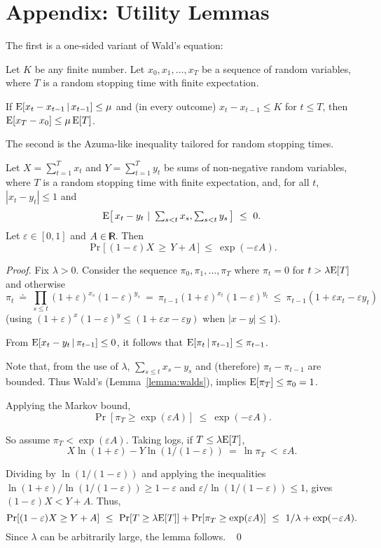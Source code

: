 \documentclass[11pt]{svjour3} \usepackage{fullpage}
\newenvironment{Proof}{\begin{proof}}{{} ~\hfill\hfill\qed~\end{proof}}
\newcommand{\eps}{\varepsilon}
\newcommand{\E}{{\rm E}}
\newcommand{\giv}{\,|\,}
\newcommand{\R}{{\sf R\hspace*{-1.5ex}\rule{0.15ex}{1.6ex}\hspace*{1.2ex}}}
\begin{document}





\section{Appendix: Utility Lemmas}

\newcommand{\epsoverdelta}{{\textstyle\frac{\eps}{\delta}}}
\renewcommand{\epsoverdelta}{\eps}

The first is a one-sided variant of Wald's equation:
\begin{lemma}\cite[lemma 4.1]{Young00KMedians}\label{lemma:walds}
Let $K$ be any finite number.
Let $x_0,x_1,\ldots,x_T$ be a sequence of random variables, 
where $T$ is a random stopping time with finite expectation. 

If $\E[x_{t} - x_{t-1} \giv x_{t-1}] \le \mu$ 
and (in every outcome)
$x_{t}-x_{t-1}\le K$ for $t\le T$, 
then
$\E[x_T-x_0] \le\mu\,\E[T]$.
\end{lemma}

The second is the Azuma-like inequality tailored for random stopping times.
\begin{lemma}
\label{lemma:chst}\label{lemma:chernoff}
Let $X=\sum_{t=1}^T x_t$ and $Y=\sum_{t=1}^T y_t$ 
be sums of non-negative random variables, 
where $T$ is a random stopping time with finite expectation,
and, for all $t$,
$|x_t-y_t|\le 1$ and
\[\textstyle
 \E\big[\,x_{t} - y_{t} \,\giv\, \sum_{s< t} x_s, \sum_{s< t} y_s\,\big]
~\le~
 0.\]
Let $\eps\in[0,1]$ and $A\in\R$.  
Then
\[\Pr\big[\,(1-\eps) X \,\ge\, Y + A\, \big] ~\le~ \exp({-\epsoverdelta}A).\]
\end{lemma}
\begin{Proof}
Fix $\lambda>0$.
Consider the sequence $\pi_0,\pi_1,\ldots,\pi_T$ where
$\pi_t = 0$ for $t> \lambda\E[T]$ and otherwise
\[
\pi_t
~\doteq~
\prod_{s\le t} (1+\eps)^{x_s}(1-\eps)^{y_s}
 ~=~
\pi_{t-1}(1+\eps)^{x_t}(1-\eps)^{y_t}
 ~\le~
\pi_{t-1}(1+\eps x_t -\eps y_t)
\]
(using $(1+\eps)^x(1-\eps)^y\le (1+\eps x-\eps y)$ when $|x-y|\le 1$).


From $\E[x_{t} -y_{t} \giv \pi_{t-1}]\le 0$, 
it follows that $\E[\pi_{t} \giv \pi_{t-1}] \le \pi_{t-1}$.

Note that, from the use of $\lambda$,
$\sum_{s\le t} x_s-y_s$ and (therefore) $\pi_t-\pi_{t-1}$ are bounded.
Thus Wald's (Lemma~\ref{lemma:walds}), implies
$\E[\pi_T] \le \pi_0 = 1$.

Applying the Markov bound,
\[
\Pr[ \pi_T \ge \exp(\eps A)]
~\le~
\exp({-\eps} A).
\]

So assume $\pi_T < \exp(\eps A)$.
Taking logs, if $T\le \lambda\E[T]$,
\[
X\ln(1+\eps) -Y\ln(1/(1-\eps)) 
 ~=~ 
\ln \pi_T
~<~ 
\eps A.\]

Dividing by $\ln(1/(1-\eps))$
and applying the inequalities $\ln(1+\eps)/\ln(1/(1-\eps))\ge 1-\eps$ and
$\eps/\ln(1/(1-\eps))\le 1$,  gives
$(1-\eps) X < Y + A$.
Thus,
\[
\Pr[(1-\eps)X\ge Y+A]
~\le~
\Pr[T\ge \lambda \E[T]]
+
\Pr[\pi_T \ge \exp(\eps A)]
~\le~
1/\lambda + \exp(-\eps A).
\]
Since $\lambda$ can be arbitrarily large, the lemma follows.
\end{Proof}
\end{document}
